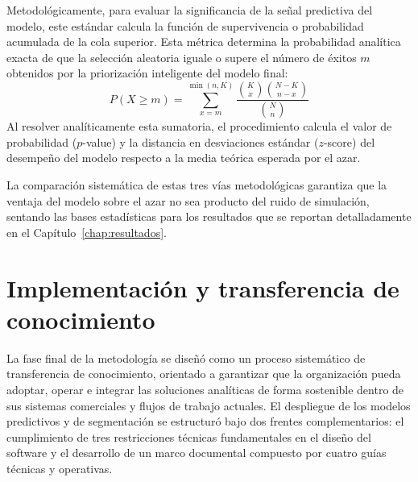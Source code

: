 \begin{enumerate}
    Metodológicamente, para evaluar la significancia de la señal predictiva del modelo, este estándar calcula la función de supervivencia o probabilidad acumulada de la cola superior. Esta métrica determina la probabilidad analítica exacta de que la selección aleatoria iguale o supere el número de éxitos $m$ obtenidos por la priorización inteligente del modelo final:
    \begin{equation}
    P(X \ge m) = \sum_{x=m}^{\min(n, K)} \frac{\binom{K}{x}\binom{N-K}{n-x}}{\binom{N}{n}}
    \end{equation}
    Al resolver analíticamente esta sumatoria, el procedimiento calcula el valor de probabilidad ($p$-value) y la distancia en desviaciones estándar ($z$-score) del desempeño del modelo respecto a la media teórica esperada por el azar.

\end{enumerate}
La comparación sistemática de estas tres vías metodológicas garantiza que la ventaja del modelo sobre el azar no sea producto del ruido de simulación, sentando las bases estadísticas para los resultados que se reportan detalladamente en el Capítulo~\ref{chap:resultados}.

\section{Implementación y transferencia de conocimiento}
La fase final de la metodología se diseñó como un proceso sistemático de transferencia de conocimiento, orientado a garantizar que la organización pueda adoptar, operar e integrar las soluciones analíticas de forma sostenible dentro de sus sistemas comerciales y flujos de trabajo actuales. El despliegue de los modelos predictivos y de segmentación se estructuró bajo dos frentes complementarios: el cumplimiento de tres restricciones técnicas fundamentales en el diseño del software y el desarrollo de un marco documental compuesto por cuatro guías técnicas y operativas.

